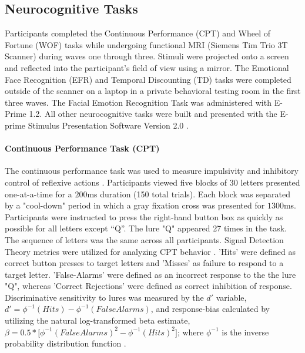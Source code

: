 \documentclass[utf8]{frontiersSCNS} %
\begin{document}
\subsection{Neurocognitive Tasks}  Participants completed the Continuous Performance (CPT) and Wheel of Fortune (WOF) tasks while undergoing functional MRI (Siemens Tim Trio 3T Scanner) during waves one through three. Stimuli were projected onto a screen and reflected into the participant's field of view using a mirror. The Emotional Face Recognition (EFR) and Temporal Discounting (TD) tasks were completed outside of the scanner on a laptop in a private behavioral testing room in the first three waves. The Facial Emotion Recognition Task was administered with E-Prime 1.2. All other neurocognitive tasks were built and presented with the E-prime Stimulus Presentation Software Version 2.0 \citep{schneider2002prime}. 
\paragraph{Continuous Performance Task (CPT)} The continuous performance task was used to measure impulsivity and inhibitory control of reflexive actions \citep{horn2003response}.  Participants viewed five blocks of $30$ letters presented one-at-a-time for a $200$ms duration (150 total trials). Each block was separated by a "cool-down" period in which a gray fixation cross was presented for $1300$ms. Participants were instructed to press the right-hand button box as quickly as possible for all letters except “Q”. The lure "Q" appeared 27 times in the task. The sequence of letters was the same across all participants.  Signal Detection Theory metrics were utilized for analyzing CPT behavior \cite{stanislaw1999calculation}. 'Hits' were defined as correct button presses to target letters and 'Misses' as failure to respond to a target letter. 'False-Alarms' were defined as an incorrect response to the the lure "Q", whereas 'Correct Rejections' were defined as correct inhibition of response. Discriminative sensitivity to lures was measured by the $d'$ variable, $d'=\phi^{-1}( Hits ) - \phi^{-1}( False Alarms )$, and response-bias calculated by utilizing the natural log-transformed beta estimate, $ \beta = 0.5*\Big[\phi^{-1}(FalseAlarms)^{2} - \phi^{-1}(Hits)^{2}\Big]$; where $\phi^{-1}$ is the inverse probability distribution function  \citep{forbes2011statistical}. 
\end{document}
